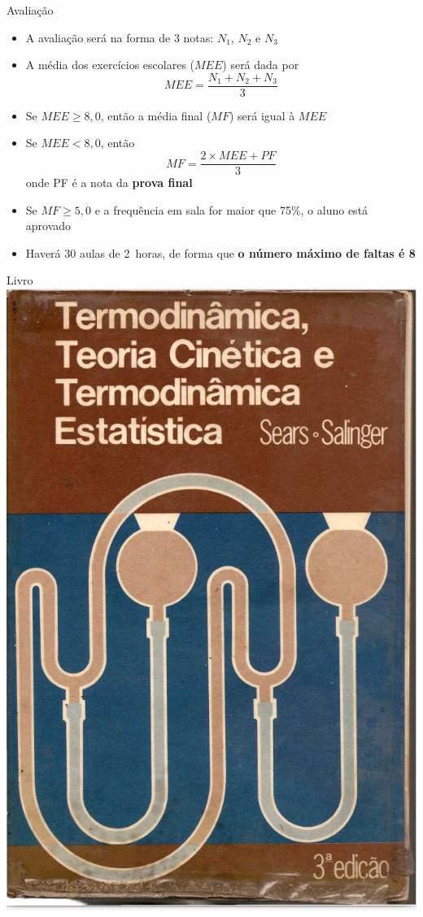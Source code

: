 \begin{frame}{Avaliação}
    \begin{itemize}
        \item A avaliação será na forma de 3 notas: \(N_1\), \(N_2\) e \(N_3\)
        \item A média dos exercícios escolares (\(MEE\)) será dada por
            \[
                MEE=\frac{N_1+N_2+N_3}{3}
            \]
        \item Se \(MEE \geq 8,0\), então a média final (\(MF\)) será igual à \(MEE\)
        \item Se \(MEE < 8,0\), então
            \[
                MF=\frac{2\times MEE+PF}{3}
            \]
            onde PF é a nota da \textbf{prova final}
        \item Se \(MF \geq 5,0\) e a frequência em sala for maior que 75\%, o aluno está aprovado
        \item Haverá 30 aulas de \SI{2}{horas}, de forma que \textbf{o número máximo de faltas é 8}
    \end{itemize}
\end{frame}

\begin{frame}{Livro}
    \centering
    \includegraphics[height=0.8\textheight]{images/Captura de tela de 2023-03-27 07-48-28.png}
\end{frame}

